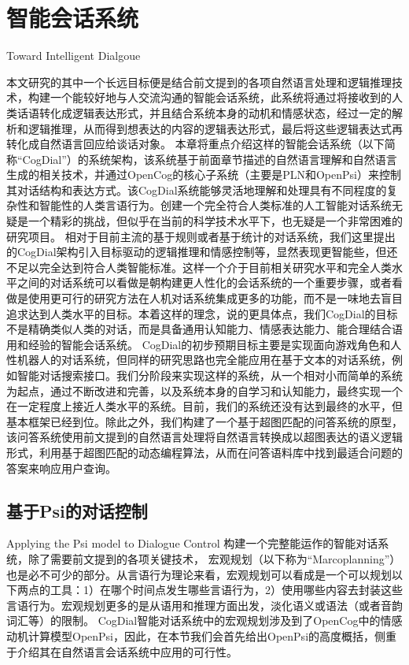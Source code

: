 ﻿\chapter{智能会话系统}{Toward Intelligent Dialgoue}

       本文研究的其中一个长远目标便是结合前文提到的各项自然语言处理和逻辑推理技术，构建一个能较好地与人交流沟通的智能会话系统，此系统将通过将接收到的人类话语转化成逻辑表达形式，并且结合系统本身的动机和情感状态，经过一定的解析和逻辑推理，从而得到想表达的内容的逻辑表达形式，最后将这些逻辑表达式再转化成自然语言回应给谈话对象。
       本章将重点介绍这样的智能会话系统（以下简称“CogDial”）的系统架构，该系统基于前面章节描述的自然语言理解和自然语言生成的相关技术，并通过OpenCog的核心子系统（主要是PLN和OpenPsi）来控制其对话结构和表达方式。该CogDial系统能够灵活地理解和处理具有不同程度的复杂性和智能性的人类言语行为。创建一个完全符合人类标准的人工智能对话系统无疑是一个精彩的挑战，但似乎在当前的科学技术水平下，也无疑是一个非常困难的研究项目。 相对于目前主流的基于规则或者基于统计的对话系统，我们这里提出的CogDial架构引入目标驱动的逻辑推理和情感控制等，显然表现更智能些，但还不足以完全达到符合人类智能标准。这样一个介于目前相关研究水平和完全人类水平之间的对话系统可以看做是朝构建更人性化的会话系统的一个重要步骤，或者看做是使用更可行的研究方法在人机对话系统集成更多的功能，而不是一味地去盲目追求达到人类水平的目标。本着这样的理念，说的更具体点，我们CogDial的目标不是精确类似人类的对话，而是具备通用认知能力、情感表达能力、能合理结合语用和经验的智能会话系统。
         CogDial的初步预期目标主要是实现面向游戏角色和人性机器人的对话系统，但同样的研究思路也完全能应用在基于文本的对话系统，例如智能对话搜索接口。我们分阶段来实现这样的系统，从一个相对小而简单的系统为起点，通过不断改进和完善，以及系统本身的自学习和认知能力，最终实现一个在一定程度上接近人类水平的系统。目前，我们的系统还没有达到最终的水平，但基本框架已经到位。除此之外，我们构建了一个基于超图匹配的问答系统的原型，该问答系统使用前文提到的自然语言处理将自然语言转换成以超图表达的语义逻辑形式，利用基于超图匹配的动态编程算法，从而在问答语料库中找到最适合问题的答案来响应用户查询。

\section{基于Psi的对话控制}{Applying the Psi model to Dialogue Control}
构建一个完整能运作的智能对话系统，除了需要前文提到的各项关键技术， 宏观规划（以下称为“Marcoplanning”）也是必不可少的部分。从言语行为理论来看，宏观规划可以看成是一个可以规划以下两点的工具：1）在哪个时间点发生哪些言语行为，2）使用哪些内容去封装这些言语行为。宏观规划更多的是从语用和推理方面出发，淡化语义或语法（或者音韵词汇等）的限制。
      CogDial智能对话系统中的宏观规划涉及到了OpenCog中的情感动机计算模型OpenPsi，因此，在本节我们会首先给出OpenPsi的高度概括，侧重于介绍其在自然语言会话系统中应用的可行性。

